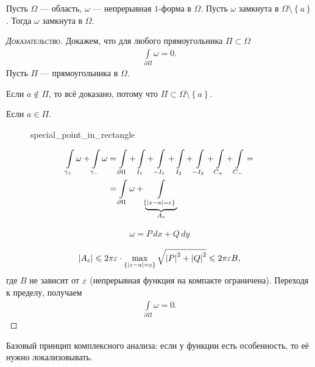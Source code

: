 \begin{lm}
 Пусть $\Omega$ --- область, $\omega$ --- непрерывная $1$-форма в $\Omega$. Пусть $\omega$ замкнута  в $\Omega \setminus \left\{ a \right\}$. Тогда $\omega$ замкнута в $\Omega$.
\end{lm}
\begin{proof}[\normalfont\textsc{Доказательство}]
 Докажем, что для любого прямоугольника $\Pi \subset \Omega$
 \begin{align*}
  \int\limits_{\partial\Pi} \omega = 0. 
 \end{align*} Пусть $\Pi$ --- прямоугольника в $\Omega$.

 Если $a \notin \Pi$, то всё доказано, потому что $\Pi \subset \Omega \setminus \left\{ a \right\}$.

 Если $a \in \Pi$.

\begin{figure}[ht]
    \centering
    \caption{special_point_in_rectangle}
    \label{fig:special_point_in_rectangle}
\end{figure}

\begin{align*}
 \int\limits_{\gamma_+}  \omega + \int\limits_{\gamma_-}  \omega &= \int\limits_{\partial\Pi} + \int\limits_{I_1}   + \int\limits_{-I_1}   + \int\limits_{I_2}  + \int\limits_{-I_2}   + \int\limits_{C_+}   + \int\limits_{C_-}   = \\
 &= \int\limits_{\partial\Pi} \omega + \underbrace{\int\limits_{\left\{ \left| z-a \right|=\varepsilon \right\}}   }_{A_{\varepsilon}}
\end{align*} 

\begin{align*}
 \omega = P\,dx + Q\,dy
\end{align*} 

\begin{align*}
 \left| A_{\varepsilon} \right| \leqslant 2\pi\varepsilon \cdot \max_{\left\{ \left| z-a \right|=\varepsilon \right\}} \sqrt{\left| P \right|^{2} + \left| Q \right|^{2}} \leqslant 2\pi\varepsilon B,
\end{align*} где $B$ не зависит от $\varepsilon$ (непрерывная функция на компакте ограничена). Переходя к пределу, получаем 
\begin{align*}
 \int\limits_{\partial\Pi}   \omega = 0.
\end{align*} 
 
\end{proof}

Базовый принцип комплексного анализа: если у функции есть особенность, то её нужно локализовывать.

